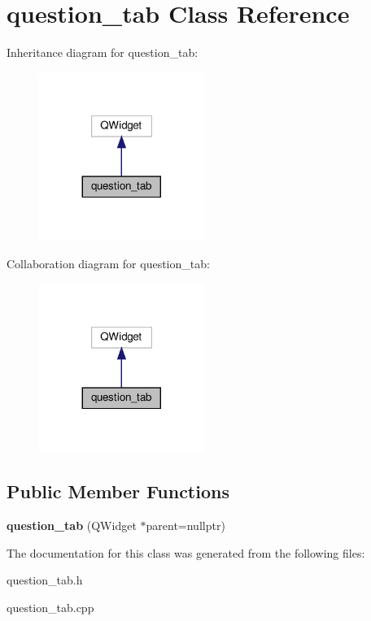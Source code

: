 \hypertarget{classquestion__tab}{}\section{question\+\_\+tab Class Reference}
\label{classquestion__tab}


Inheritance diagram for question\+\_\+tab\+:\nopagebreak
\begin{figure}[H]
\begin{center}
\leavevmode
\includegraphics[width=152pt]{classquestion__tab__inherit__graph}
\end{center}
\end{figure}


Collaboration diagram for question\+\_\+tab\+:\nopagebreak
\begin{figure}[H]
\begin{center}
\leavevmode
\includegraphics[width=152pt]{classquestion__tab__coll__graph}
\end{center}
\end{figure}
\subsection*{Public Member Functions}
\begin{DoxyCompactItemize}
\item 
\mbox{\label{classquestion__tab_a22107ddfe29017c10a294c3f42d7c201}} 
{\bfseries question\+\_\+tab} (Q\+Widget $\ast$parent=nullptr)
\end{DoxyCompactItemize}


The documentation for this class was generated from the following files\+:\begin{DoxyCompactItemize}
\item 
question\+\_\+tab.\+h\item 
question\+\_\+tab.\+cpp\end{DoxyCompactItemize}
